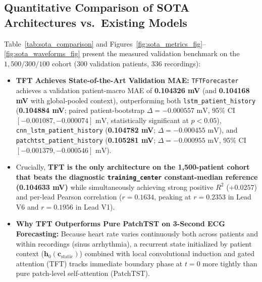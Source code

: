 \documentclass[11pt,a4paper]{article}
\begin{document}
\subsection{Quantitative Comparison of SOTA Architectures vs.\ Existing Models}
Table~\ref{tab:sota_comparison} and Figures~\ref{fig:sota_metrics_fig}--\ref{fig:sota_waveforms_fig} present the measured validation benchmark on the $1{,}500 / 300 / 100$ cohort ($300$ validation patients, $336$ recordings):
\begin{itemize}
    \item \textbf{TFT Achieves State-of-the-Art Validation MAE:} \texttt{TFTForecaster} achieves a validation patient-macro MAE of \textbf{0.104326 mV} (and \textbf{0.104168 mV} with global-pooled context), outperforming both \texttt{lstm\_patient\_history} (\textbf{0.104884 mV}; paired patient-bootstrap $\Delta = -0.000557\text{ mV}$, 95\% CI $[-0.001087, -0.000074]\text{ mV}$, statistically significant at $p < 0.05$), \texttt{cnn\_lstm\_patient\_history} (\textbf{0.104782 mV}; $\Delta = -0.000455\text{ mV}$), and \texttt{patchtst\_patient\_history} (\textbf{0.105281 mV}; $\Delta = -0.000955\text{ mV}$, 95\% CI $[-0.001379, -0.000546]\text{ mV}$).
    \item Crucially, \textbf{TFT is the only architecture on the 1,500-patient cohort that beats the diagnostic \texttt{training\_center} constant-median reference (0.104633 mV)} while simultaneously achieving strong positive $R^2$ ($+0.0257$) and per-lead Pearson correlation ($r = 0.1634$, peaking at $r = 0.2353$ in Lead V6 and $r = 0.1956$ in Lead V1).
    \item \textbf{Why TFT Outperforms Pure PatchTST on 3-Second ECG Forecasting:} Because heart rate varies continuously both across patients and within recordings (sinus arrhythmia), a recurrent state initialized by patient context ($\mathbf{h}_0(\mathbf{c}_{\text{static}})$) combined with local convolutional induction and gated attention (TFT) tracks immediate boundary phase at $t = 0$ more tightly than pure patch-level self-attention (PatchTST).
\end{itemize}
\end{document}
